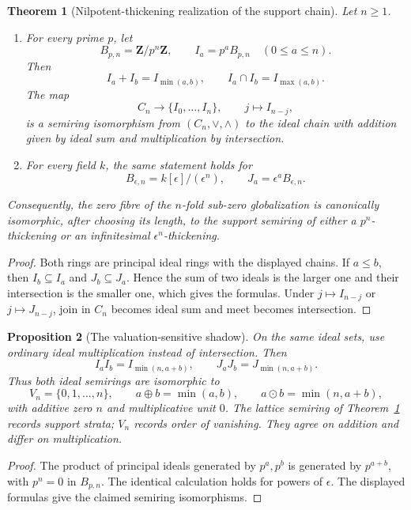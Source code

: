 \documentclass[11pt]{amsart}
\numberwithin{equation}{section}
\newtheorem{theorem}{Theorem}[section]
\newtheorem{proposition}[theorem]{Proposition}
\theoremstyle{definition}
\newcommand{\Z}{\mathbf Z}
\begin{document}
\begin{theorem}[Nilpotent-thickening realization of the support chain]
\label{thm:nilpotent-chain-realization}
Let $n\geq1$.
\begin{enumerate}[label=\textup{(\arabic*)}]
\item For every prime $p$, let
\[
B_{p,n}=\Z/p^n\Z,
\qquad
I_a=p^aB_{p,n}
\quad(0\leq a\leq n).
\]
Then
\[
I_a+I_b=I_{\min(a,b)},
\qquad
I_a\cap I_b=I_{\max(a,b)}.
\]
The map
\[
C_n\longrightarrow\{I_0,\dots,I_n\},
\qquad
j\longmapsto I_{n-j},
\]
is a semiring isomorphism from $(C_n,\vee,\wedge)$ to the ideal chain
with addition given by ideal sum and multiplication by intersection.
\item For every field $k$, the same statement holds for
\[
B_{\epsilon,n}=k[\epsilon]/(\epsilon^n),
\qquad
J_a=\epsilon^aB_{\epsilon,n}.
\]
\end{enumerate}
Consequently, the zero fibre of the $n$-fold sub-zero globalization is
canonically isomorphic, after choosing its length, to the support semiring
of either a $p^n$-thickening or an infinitesimal $\epsilon^n$-thickening.
\end{theorem}

\begin{proof}
Both rings are principal ideal rings with the displayed chains.  If
$a\leq b$, then $I_b\subseteq I_a$ and $J_b\subseteq J_a$.  Hence the
sum of two ideals is the larger one and their intersection is the smaller
one, which gives the formulas.  Under $j\mapsto I_{n-j}$ or
$j\mapsto J_{n-j}$, join in $C_n$ becomes ideal sum and meet becomes
intersection.
\end{proof}

\begin{proposition}[The valuation-sensitive shadow]
\label{prop:truncated-valuation-semiring}
On the same ideal sets, use ordinary ideal multiplication instead of
intersection.  Then
\[
I_aI_b=I_{\min(n,a+b)},
\qquad
J_aJ_b=J_{\min(n,a+b)}.
\]
Thus both ideal semirings are isomorphic to
\[
V_n=\{0,1,\dots,n\},
\qquad
a\oplus b=\min(a,b),
\qquad
a\odot b=\min(n,a+b),
\]
with additive zero $n$ and multiplicative unit $0$.  The lattice semiring
of Theorem~\ref{thm:nilpotent-chain-realization} records support strata;
$V_n$ records order of vanishing.  They agree on addition and differ on
multiplication.
\end{proposition}

\begin{proof}
The product of principal ideals generated by $p^a,p^b$ is generated by
$p^{a+b}$, with $p^n=0$ in $B_{p,n}$.  The identical calculation holds
for powers of $\epsilon$.  The displayed formulas give the claimed
semiring isomorphisms.
\end{proof}
\end{document}
